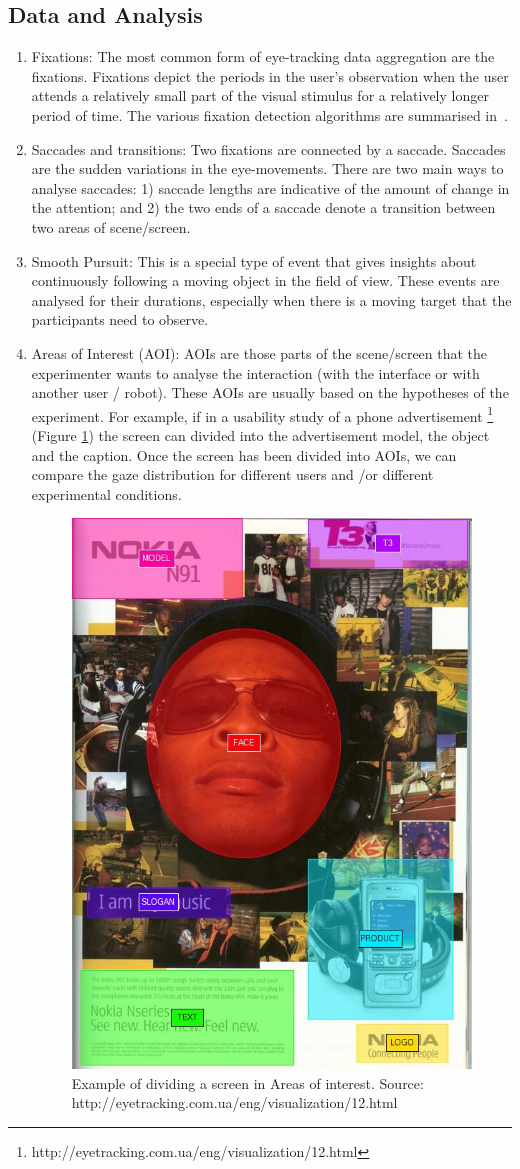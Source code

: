 \documentclass{sig-alternate}
\begin{document}
\subsection{Data and Analysis}

\begin{enumerate}
\item Fixations: The most common form of eye-tracking data aggregation are the fixations. Fixations depict the periods in the user's observation when the user attends a relatively small part of the visual stimulus for a relatively longer period of time. The various fixation detection algorithms are summarised in~\cite{duchowski2007eye}. 

\item Saccades and transitions: Two fixations are connected by a saccade. Saccades are the sudden variations in the eye-movements. There are two main ways to analyse saccades: 1) saccade lengths are indicative of the amount of change in the attention; and 2) the two ends of a saccade denote a transition between two areas of scene/screen.

\item Smooth Pursuit: This is a special type of event that gives insights about continuously following a moving object in the field of view. These events are analysed for their durations, especially when there is a moving target that the participants need to observe.

\item Areas of Interest (AOI):  AOIs are those parts of the scene/screen that the experimenter wants to analyse the interaction (with the interface or with another user / robot). These AOIs are usually based on the hypotheses of the experiment. For example, if in a usability study of a phone advertisement \footnote{http://eyetracking.com.ua/eng/visualization/12.html} (Figure \ref{aoi}) the screen can divided into the advertisement model, the object and the caption. Once the screen has been divided into AOIs, we can compare the gaze distribution for different users and /or different experimental conditions.

\begin{figure}
    \centering
    \includegraphics[width=0.4\linewidth]{nokia.jpg}
    \caption{Example of dividing a screen in Areas of interest. Source: http://eyetracking.com.ua/eng/visualization/12.html}
    \label{aoi}
\end{figure}



\end{enumerate}
\end{document}
